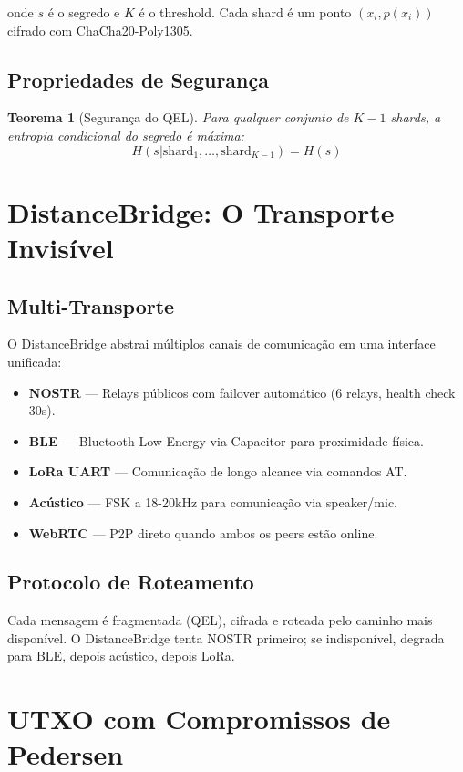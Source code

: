 \documentclass[12pt,a4paper,twoside]{book}
\newtheorem{theorem}{Teorema}[chapter]
\theoremstyle{remark}
\begin{document}
onde $s$ é o segredo e $K$ é o threshold. Cada shard é um ponto $(x_i, p(x_i))$ cifrado com ChaCha20-Poly1305.

\section{Propriedades de Segurança}

\begin{theorem}[Segurança do QEL]
Para qualquer conjunto de $K-1$ shards, a entropia condicional do segredo é máxima:
\[
H(s | \text{shard}_1, \ldots, \text{shard}_{K-1}) = H(s)
\]
\end{theorem}

\chapter{DistanceBridge: O Transporte Invisível}
\label{chap:distancebridge}

\section{Multi-Transporte}

O DistanceBridge abstrai múltiplos canais de comunicação em uma interface unificada:

\begin{itemize}
    \item \textbf{NOSTR} — Relays públicos com failover automático (6 relays, health check 30s).
    \item \textbf{BLE} — Bluetooth Low Energy via Capacitor para proximidade física.
    \item \textbf{LoRa UART} — Comunicação de longo alcance via comandos AT.
    \item \textbf{Acústico} — FSK a 18-20kHz para comunicação via speaker/mic.
    \item \textbf{WebRTC} — P2P direto quando ambos os peers estão online.
\end{itemize}

\section{Protocolo de Roteamento}

Cada mensagem é fragmentada (QEL), cifrada e roteada pelo caminho mais disponível. O DistanceBridge tenta NOSTR primeiro; se indisponível, degrada para BLE, depois acústico, depois LoRa.

\chapter{UTXO com Compromissos de Pedersen}
\label{chap:utxo}
\end{document}
